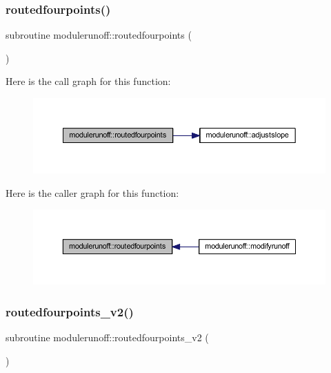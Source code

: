 \subsubsection{\texorpdfstring{routedfourpoints()}{routedfourpoints()}}
{\footnotesize\ttfamily subroutine modulerunoff\+::routedfourpoints (\begin{DoxyParamCaption}{ }\end{DoxyParamCaption})\hspace{0.3cm}{\ttfamily [private]}}

Here is the call graph for this function\+:
\nopagebreak
\begin{figure}[H]
\begin{center}
\leavevmode
\includegraphics[width=350pt]{namespacemodulerunoff_a0a2296b090b1a35c74f3a4c0e35ad401_cgraph}
\end{center}
\end{figure}
Here is the caller graph for this function\+:
\nopagebreak
\begin{figure}[H]
\begin{center}
\leavevmode
\includegraphics[width=350pt]{namespacemodulerunoff_a0a2296b090b1a35c74f3a4c0e35ad401_icgraph}
\end{center}
\end{figure}
\mbox{\label{namespacemodulerunoff_aeedcf3916bc6da030fd004afb251262f}} 
\subsubsection{\texorpdfstring{routedfourpoints\+\_\+v2()}{routedfourpoints\_v2()}}
{\footnotesize\ttfamily subroutine modulerunoff\+::routedfourpoints\+\_\+v2 (\begin{DoxyParamCaption}{ }\end{DoxyParamCaption})\hspace{0.3cm}{\ttfamily [private]}}

